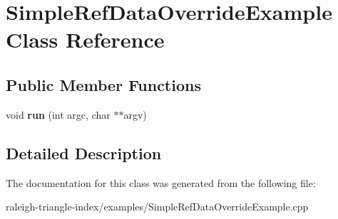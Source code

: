 \section{Simple\+Ref\+Data\+Override\+Example Class Reference}
\label{class_simple_ref_data_override_example}
\subsection*{Public Member Functions}
\begin{DoxyCompactItemize}
\item 
void {\bfseries run} (int argc, char $\ast$$\ast$argv)\label{class_simple_ref_data_override_example_a9b2abff00ebbf1181d1e0958cb0a34e1}

\end{DoxyCompactItemize}


\subsection{Detailed Description}


The documentation for this class was generated from the following file\+:\begin{DoxyCompactItemize}
\item 
raleigh-\/triangle-\/index/examples/Simple\+Ref\+Data\+Override\+Example.\+cpp\end{DoxyCompactItemize}
